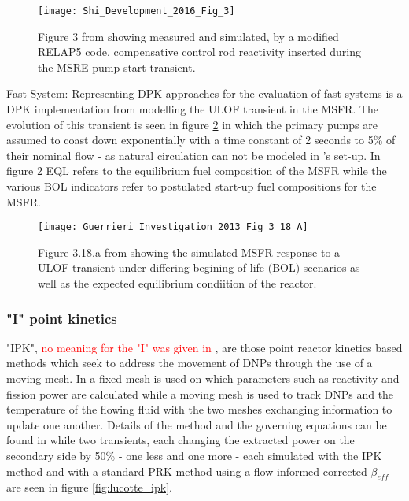 \documentclass[review]{elsarticle}
\begin{document}
\begin{figure}[h]
   \centering
   \texttt{[image: Shi\_Development\_2016\_Fig\_3]}
   \caption{Figure 3 from \cite{shi_development_2016} showing measured and simulated, by a modified
   RELAP5 code, compensative control rod reactivity inserted during the MSRE pump start
   transient.} 
   \label{fig:shi_msre_ps}
\end{figure}

\par Fast System: Representing DPK approaches for the evaluation of fast
systems is a DPK implementation from \cite{guerrieri_investigation_2013}
modelling the ULOF transient in the MSFR. The evolution of this transient is
seen in figure \ref{fig:guerrieri_msfr_ulof} in which the primary pumps are
assumed to coast down exponentially with a time constant of 2 seconds to 5\%
 of their nominal flow - as natural circulation can not be modeled in
\cite{guerrieri_investigation_2013}'s set-up. In figure 
\ref{fig:guerrieri_msfr_ulof} 
EQL refers to the equilibrium fuel composition of the
MSFR while the various BOL indicators refer to postulated start-up fuel
compositions for the MSFR. 

\begin{figure}[h]
   \centering
   \texttt{[image: Guerrieri\_Investigation\_2013\_Fig\_3\_18\_A]}
   \caption{Figure 3.18.a from \cite{guerrieri_investigation_2013} showing the simulated MSFR
   response to a ULOF transient under differing begining-of-life (BOL) scenarios as well as the
   expected equilibrium condiition of the reactor.} 
   \label{fig:guerrieri_msfr_ulof}
\end{figure}


\subsubsection{"I" point kinetics} \label{sssec:spk}
"IPK", \textcolor{red}{no meaning for the "I" was given in \cite{merle-lucotte_physical_2015}},
are those point reactor kinetics based methods which seek to address the
movement of DNPs through the use of a moving mesh. In
\cite{merle-lucotte_physical_2015} a fixed mesh is used on which parameters
such as reactivity and fission power are calculated while a moving mesh is
used to track DNPs and the temperature of the flowing fluid with the two
meshes exchanging information to update one another. Details of the method and
the governing equations can be found in \cite{merle-lucotte_physical_2015} while
two transients, each changing the extracted power on the secondary side by
50\% - one less and one more - each simulated with the IPK method and with a
standard PRK method using a flow-informed corrected $\beta_{eff}$ are seen
in figure \ref{fig:lucotte_ipk}.
\end{document}
